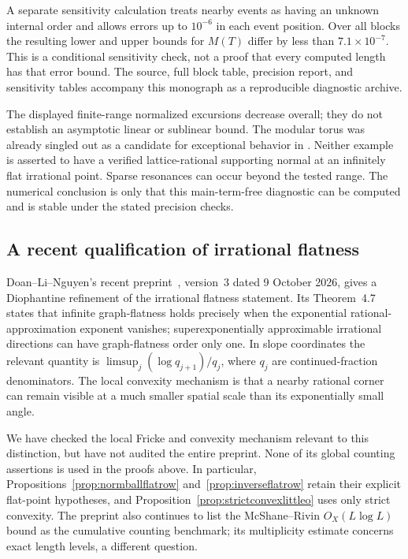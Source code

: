 \documentclass[11pt,a4paper]{article}
\numberwithin{equation}{section}
\theoremstyle{definition}
\theoremstyle{remark}
\begin{document}
A separate sensitivity calculation treats nearby events as having an
unknown internal order and allows errors up to $10^{-6}$ in each event
position. Over all blocks the resulting lower and upper bounds for
$M(T)$ differ by less than $7.1\times10^{-7}$. This is a conditional
sensitivity check, not a proof that every computed length has that error
bound. The source, full block table, precision report, and sensitivity
tables accompany this monograph as a reproducible diagnostic archive.

The displayed finite-range normalized excursions decrease overall;
they do not establish an asymptotic linear or sublinear bound. The modular
torus was already singled out as a candidate for exceptional behavior in
\cite[Conjecture~4.3]{McShaneRivinTori}. Neither example is asserted to
have a verified lattice-rational supporting normal at an infinitely flat
irrational point. Sparse resonances can occur beyond the tested range.
The numerical conclusion is only that this main-term-free diagnostic can
be computed and is stable under the stated precision checks.

\subsection{A recent qualification of irrational flatness}
\label{subsec:recentflatnessqualification}

Doan--Li--Nguyen's recent preprint~\cite{DoanLiNguyenStableNorm},
version~3 dated 9 October 2026, gives a Diophantine refinement of the
irrational flatness statement. Its Theorem~4.7 states that infinite
graph-flatness holds precisely when the exponential rational-approximation
exponent vanishes; superexponentially approximable irrational directions
can have graph-flatness order only one. In slope coordinates the relevant
quantity is $\limsup_j(\log q_{j+1})/q_j$, where $q_j$ are continued-fraction
denominators. The local convexity mechanism is that a nearby rational
corner can remain visible at a much smaller spatial scale than its
exponentially small angle.

We have checked the local Fricke and convexity mechanism relevant to
this distinction, but have not audited the entire preprint. None of its
global counting assertions is used in the proofs above. In particular,
Propositions~\ref{prop:normballflatrow} and~\ref{prop:inverseflatrow}
retain their explicit flat-point hypotheses, and
Proposition~\ref{prop:strictconvexlittleo} uses only strict convexity.
The preprint also continues to list the McShane--Rivin $O_X(L\log L)$
bound as the cumulative counting benchmark; its multiplicity estimate
concerns exact length levels, a different question.
\end{document}
